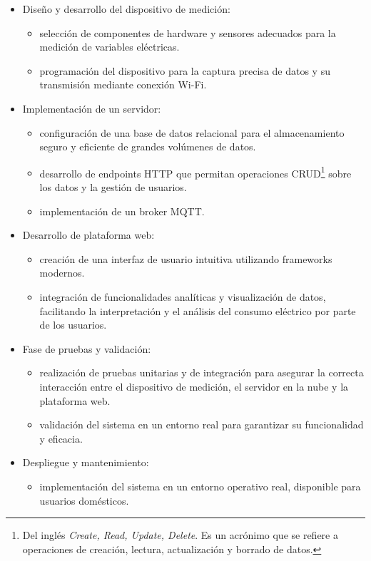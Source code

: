 \begin{itemize}
	\item Diseño y desarrollo del dispositivo de medición:
		\begin{itemize}
		\item selección de componentes de hardware y sensores adecuados para la medición de variables eléctricas.
		\item programación del dispositivo para la captura precisa de datos y su transmisión mediante conexión Wi-Fi.
		\end{itemize}
	\item Implementación de un servidor:
		\begin{itemize}
		\item configuración de una base de datos relacional para el almacenamiento seguro y eficiente de grandes volúmenes de datos.
		\item desarrollo de endpoints HTTP que permitan operaciones CRUD\footnote{Del inglés \textit{Create, Read, Update, Delete}. Es un acrónimo que se refiere a operaciones de creación, lectura, actualización y borrado de datos.} sobre los datos y la gestión de usuarios.
		\item implementación de un broker MQTT.
		\end{itemize}
	\item Desarrollo de plataforma web:
	\begin{itemize}
		\item creación de una interfaz de usuario intuitiva utilizando frameworks modernos.
		\item integración de funcionalidades analíticas y visualización de datos, facilitando la interpretación y el análisis del consumo eléctrico por parte de los usuarios.
	\end{itemize}
	\item Fase de pruebas y validación:
	\begin{itemize}
		\item realización de pruebas unitarias y de integración para asegurar la correcta interacción entre el dispositivo de medición, el servidor en la nube y la plataforma web.
		\item validación del sistema en un entorno real para garantizar su funcionalidad y eficacia.
	\end{itemize}
	\item Despliegue y mantenimiento:
	\begin{itemize}
		\item implementación del sistema en un entorno operativo real, disponible para usuarios domésticos.
	\end{itemize}
\end{itemize} 


